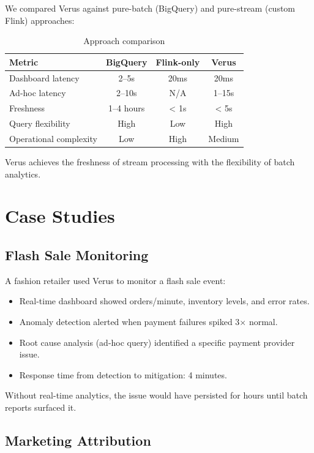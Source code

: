 \documentclass[11pt,twocolumn]{article}
\begin{document}
We compared Verus against pure-batch (BigQuery) and pure-stream (custom Flink) approaches:

\begin{table}[h]
\centering
\caption{Approach comparison}
\label{tab:comparison}
\begin{tabular}{lccc}
\hline
Metric & BigQuery & Flink-only & Verus \\
\hline
Dashboard latency & 2--5s & 20ms & 20ms \\
Ad-hoc latency & 2--10s & N/A & 1--15s \\
Freshness & 1--4 hours & < 1s & < 5s \\
Query flexibility & High & Low & High \\
Operational complexity & Low & High & Medium \\
\hline
\end{tabular}
\end{table}

Verus achieves the freshness of stream processing with the flexibility of batch analytics.

\section{Case Studies}

\subsection{Flash Sale Monitoring}

A fashion retailer used Verus to monitor a flash sale event:

\begin{itemize}
\item Real-time dashboard showed orders/minute, inventory levels, and error rates.
\item Anomaly detection alerted when payment failures spiked 3$\times$ normal.
\item Root cause analysis (ad-hoc query) identified a specific payment provider issue.
\item Response time from detection to mitigation: 4 minutes.
\end{itemize}

Without real-time analytics, the issue would have persisted for hours until batch reports surfaced it.

\subsection{Marketing Attribution}
\end{document}
